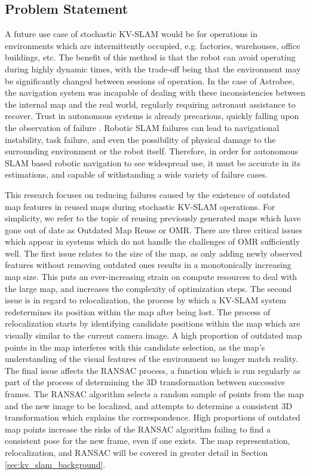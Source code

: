 \subsection{Problem Statement}

A future use case of stochastic KV-SLAM would be for operations in environments which are intermittently occupied, e.g. factories, warehouses, office buildings, etc. The benefit of this method is that the robot can avoid operating during highly dynamic times, with the trade-off being that the environment may be significantly changed between sessions of operation. In the case of Astrobee, the navigation system was incapable of dealing with these inconsistencies between the internal map and the real world, regularly requiring astronaut assistance to recover. Trust in autonomous systems is already precarious, quickly falling upon the observation of failure \cite{robinetteEffectRobotPerformance2017}. Robotic SLAM failures can lead to navigational instability, task failure, and even the possibility of physical damage to the surrounding environment or the robot itself\cite{nahavandiComprehensiveReviewAutonomous2025a}. Therefore, in order for autonomous SLAM based robotic navigation to see widespread use, it must be accurate in its estimations, and capable of withstanding a wide variety of failure cases.

This research focuses on reducing failures caused by the existence of outdated map features in reused maps during stochastic KV-SLAM operations. For simplicity, we refer to the topic of reusing previously generated maps which have gone out of date as Outdated Map Reuse or OMR. There are three critical issues which appear in systems which do not handle the challenges of OMR sufficiently well. The first issue relates to the size of the map, as only adding newly observed features without removing outdated ones results in a monotonically increasing map size. This puts an ever-increasing strain on compute resources to deal with the large map, and increases the complexity of optimization steps. The second issue is in regard to relocalization, the process by which a KV-SLAM system redetermines its position within the map after being lost. The process of relocalization starts by identifying candidate positions within the map which are visually similar to the current camera image. A high proportion of outdated map points in the map interferes with this candidate selection, as the map's understanding of the visual features of the environment no longer match reality. The final issue affects the RANSAC process, a function which is run regularly as part of the process of determining the 3D transformation between successive frames. The RANSAC algorithm selects a random sample of points from the map and the new image to be localized, and attempts to determine a consistent 3D transformation which explains the correspondence. High proportions of outdated map points increase the risks of the RANSAC algorithm failing to find a consistent pose for the new frame, even if one exists. The map representation, relocalization, and RANSAC will be covered in greater detail in Section \ref{sec:kv_slam_background}.

